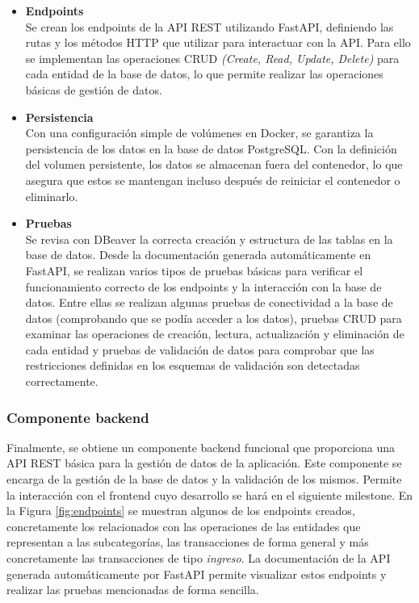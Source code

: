 \begin{itemize}
    \item \textbf{Endpoints}\\
        Se crean los endpoints de la API REST utilizando FastAPI, definiendo las rutas y los métodos HTTP que utilizar para interactuar con la API. Para ello se implementan las operaciones CRUD \textit{(Create, Read, Update, Delete)} para cada entidad de la base de datos, lo que permite realizar las operaciones básicas de gestión de datos.

    \item \textbf{Persistencia}\\
        Con una configuración simple de volúmenes en Docker, se garantiza la persistencia de los datos en la base de datos PostgreSQL. Con la definición del volumen persistente, los datos se almacenan fuera del contenedor, lo que asegura que estos se mantengan incluso después de reiniciar el contenedor o eliminarlo.

    \item \textbf{Pruebas}\\
        Se revisa con DBeaver la correcta creación y estructura de las tablas en la base de datos.
        Desde la documentación generada automáticamente en FastAPI, se realizan varios tipos de pruebas básicas para verificar el funcionamiento correcto de los endpoints y la interacción con la base de datos. Entre ellas se realizan algunas pruebas de conectividad a la base de datos (comprobando que se podía acceder a los datos), pruebas CRUD para examinar las operaciones de creación, lectura, actualización y eliminación de cada entidad y pruebas de validación de datos para comprobar que las restricciones definidas en los esquemas de validación son detectadas correctamente.
\end{itemize}

\subsubsection{Componente backend}
Finalmente, se obtiene un componente backend funcional que proporciona una API REST básica para la gestión de datos de la aplicación. Este componente se encarga de la gestión de la base de datos y la validación de los mismos. Permite la interacción con el frontend cuyo desarrollo se hará en el siguiente milestone. En la Figura \ref{fig:endpoints} se muestran algunos de los endpoints creados, concretamente los relacionados con las operaciones de las entidades que representan a las subcategorías, las transacciones de forma general y más concretamente las transacciones de tipo \textit{ingreso}. La documentación de la API generada automáticamente por FastAPI permite visualizar estos endpoints y realizar las pruebas mencionadas de forma sencilla.

